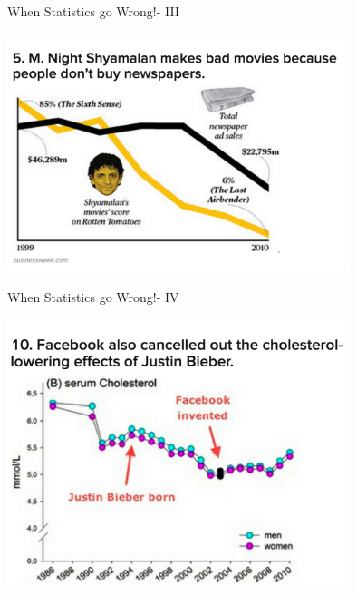 \documentclass{beamer}\usepackage[]{graphicx}\usepackage[]{color}
\begin{document}
\begin{frame}[fragile]{When Statistics go Wrong!- III \;\;}

\includegraphics[width=10cm,keepaspectratio]{shyamalan_newspapers.png}

\end{frame}

\begin{frame}[fragile]{When Statistics go Wrong!- IV \;\;}

\includegraphics[width=10cm,keepaspectratio]{facebook_bieber.png}

\end{frame}
\end{document}
